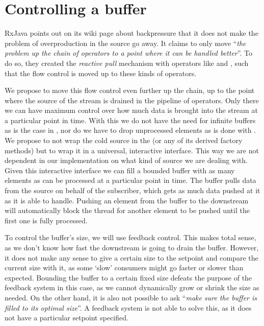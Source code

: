 \section{Controlling a buffer}
RxJava points out on its wiki page \cite{RxJava-Wiki-Backpressure} about backpressure that it does not make the problem of overproduction in the source go away. It claims to only move ``\textit{the problem up the chain of operators to a point where it can be handled better}''. To do so, they created the \textit{reactive pull} mechanism with operators like  and , such that the flow control is moved up to these kinds of operators.

We propose to move this flow control even further up the chain, up to the point where the source of the stream is drained in the pipeline of operators. Only there we can have maximum control over how much data is brought into the stream at a particular point in time. With this we do not have the need for infinite buffers as is the case in , nor do we have to drop unprocessed elements as is done with . We propose to not wrap the cold source in the  (or any of its derived factory methods) but to wrap it in a universal, interactive interface. This way we are not dependent in our implementation on what kind of source we are dealing with. Given this interactive interface we can fill a bounded buffer with as many elements as can be processed at a particular point in time. The buffer pulls data from the source on behalf of the subscriber, which gets as much data pushed at it as it is able to handle. Pushing an element from the buffer to the downstream will automatically block the thread for another element to be pushed until the first one is fully processed.

To control the buffer's size, we will use feedback control. This makes total sense, as we don't know how fast the downstream is going to drain the buffer. However, it does not make any sense to give a certain size to the setpoint and compare the current size with it, as some `slow' consumers might go faster or slower than expected. Bounding the buffer to a certain fixed size defeats the purpose of the feedback system in this case, as we cannot dynamically grow or shrink the size as needed. On the other hand, it is also not possible to ask ``\textit{make sure the buffer is filled to its optimal size}''. A feedback system is not able to solve this, as it does not have a particular setpoint specified.

